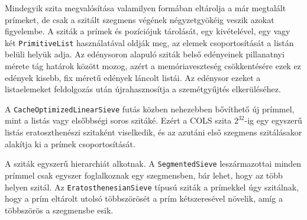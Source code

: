 Mindegyik szita megvalósítása valamilyen formában eltárolja a már megtalált prímeket, de csak a szitált szegmens végének négyzetgyökéig veszik azokat figyelembe.
A sziták a prímek és pozíciójuk tárolását, egy kivételével, egy vagy két \texttt{PrimitiveList} használatával oldják meg, az elemek csoportosítását a listán belüli helyük adja.
Az edénysoron alapuló sziták belső edényeinek pillanatnyi mérete tág határok között mozog, azért a memóriaveszteség csökkentésére ezek ez edények kisebb, fix méretű edények láncolt listái.
Az edénysor ezeket a listaelemeket feldolgozás után újrahasznosítja a szemétgyűjtés elkerüléséhez.

A \texttt{CacheOptimizedLinearSieve} futás közben nehezebben bővíthető új prímmel, mint a listás vagy elsőbbségi soros szitáké.
Ezért a COLS szita $2^{32}$-ig egy egyszerű listás eratoszthenészi szitaként viselkedik, és az azutáni első szegmens szitálásakor alakítja ki a prímek csoportosítását.

A sziták egyszerű hierarchiát alkotnak.
A \texttt{SegmentedSieve} leszármazottai minden prímmel csak egyszer foglalkoznak egy szegmensben, bár lehet, hogy az több helyen szitál.
Az \texttt{EratosthenesianSieve} típusú sziták a prímekkel úgy szitálnak, hogy a prím eltárolt utolsó többszörösét a prím kétszeresével növelik, amíg a többszörös a szegmensbe esik.


